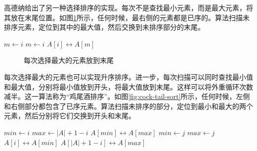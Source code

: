 \documentclass[b5paper]{ctexart}
\begin{document}
高德纳给出了另一种选择排序的实现\cite{TAOCP}。每次不是查找最小元素，而是最大元素，将其放在末尾位置。如图\ref{fig:knuth-ssort}所示，任何时候，最右侧的元素都是已序的。算法扫描未排序元素，定位到其中的最大值，然后交换到未排序部分的末尾。

\begin{algorithmic}[1]
    \State $m \gets i$
        \State $m \gets i$
      \EndIf
    \EndFor
    \State {} $A[i] \leftrightarrow A[m]$
  \EndFor
\EndProcedure
\end{algorithmic}

\begin{figure}[htbp]
  \centering
  \caption{每次选择最大的元素放到末尾}
  \label{fig:knuth-ssort}
\end{figure}

每次选择最大的元素也可以实现升序排序。进一步，每次扫描可以同时查找最小值和最大值，分别将最小值放到开头，将最大值放到末尾。这样可以将外重循环次数减半。这一算法称为“鸡尾酒排序”。如图\ref{fig:cock-tail-sort}所示，任何时候，左侧和右侧部分都包含了已序元素。算法扫描未排序的部分，定位到最小和最大的两个元素，然后分别将它们交换到开头和末尾。

\begin{algorithmic}[1]
    \State $min \gets i$
    \State $max \gets |A| + 1 - i$
      \State {} $A[min] \leftrightarrow A[max]$
    \EndIf
        \State $min \gets j$
      \EndIf
        \State $max \gets j$
      \EndIf
    \EndFor
    \State {} $A[i] \leftrightarrow A[min]$
    \State {} $A[|A|+1-i] \leftrightarrow A[max]$
  \EndFor
\EndProcedure
\end{algorithmic}
\end{document}
